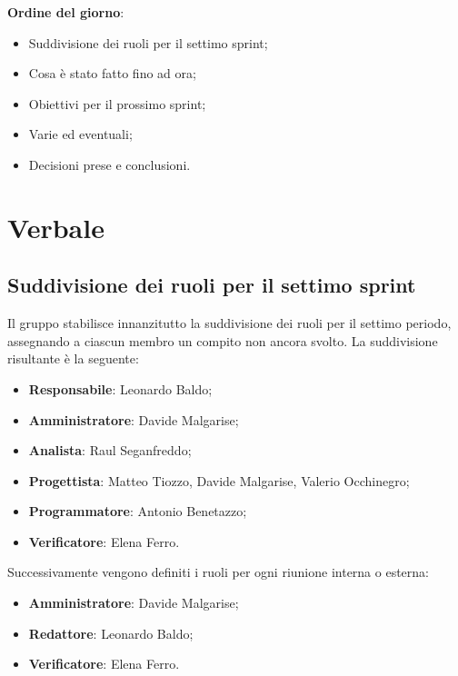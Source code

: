 \documentclass[italian,12pt]{article}
\begin{document}
\raggedright
\textbf{Ordine del giorno}:
\begin{itemize}
	\item Suddivisione dei ruoli per il settimo sprint;
	\item Cosa è stato fatto fino ad ora;
	\item Obiettivi per il prossimo sprint;
	\item Varie ed eventuali;
	\item Decisioni prese e conclusioni.
\end{itemize}

\newpage

\section{Verbale}
\subsection{Suddivisione dei ruoli per il settimo sprint}
Il gruppo stabilisce innanzitutto la suddivisione dei ruoli per il settimo periodo, assegnando a ciascun membro un compito non ancora svolto. La suddivisione risultante è la seguente:
\begin{itemize}
	\item \textbf{Responsabile}: Leonardo Baldo;
	\item \textbf{Amministratore}: Davide Malgarise;
	\item \textbf{Analista}: Raul Seganfreddo;
	\item \textbf{Progettista}: Matteo Tiozzo, Davide Malgarise, Valerio Occhinegro;
	\item \textbf{Programmatore}: Antonio Benetazzo;
	\item \textbf{Verificatore}: Elena Ferro.
\end{itemize}
Successivamente vengono definiti i ruoli per ogni riunione interna o esterna:
\begin{itemize}
	\item \textbf{Amministratore}: Davide Malgarise;
	\item \textbf{Redattore}: Leonardo Baldo;
	\item \textbf{Verificatore}: Elena Ferro.
\end{itemize}
\end{document}
